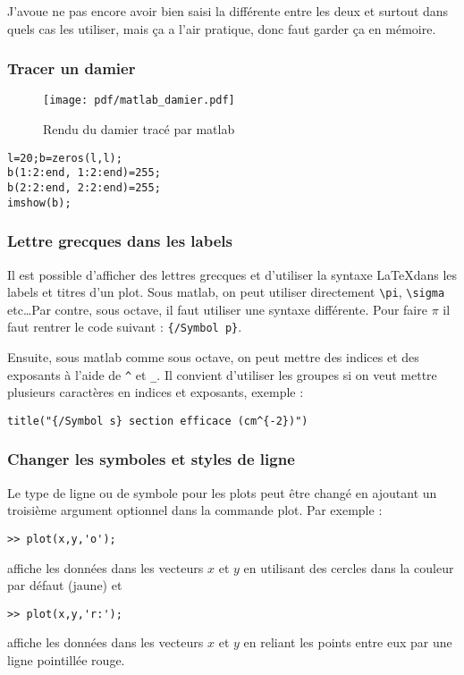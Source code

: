 \documentclass[a4paper,twoside]{article}
\begin{document}
J'avoue ne pas encore avoir bien saisi la différente entre les deux et surtout dans quels cas les utiliser, mais ça a l'air pratique, donc faut garder ça en mémoire.

\subsubsection{Tracer un damier}
\begin{figure}[htb]
\centering
\texttt{[image: pdf/matlab\_damier.pdf]}
\caption{Rendu du damier tracé par matlab}
\end{figure}

\begin{verbatim}
l=20;b=zeros(l,l);
b(1:2:end, 1:2:end)=255;
b(2:2:end, 2:2:end)=255;
imshow(b);
\end{verbatim}

\subsubsection{Lettre grecques dans les labels}
Il est possible d'afficher des lettres grecques et d'utiliser la syntaxe \LaTeX dans les labels et titres d'un plot. Sous matlab, on peut utiliser directement \verb|\pi|, \verb|\sigma| etc\dots Par contre, sous octave, il faut utiliser une syntaxe différente. Pour faire $\pi$ il faut rentrer le code suivant : \verb|{/Symbol p}|.

Ensuite, sous matlab comme sous octave, on peut mettre des indices et des exposants à l'aide de \verb|^| et \verb|_|. Il convient d'utiliser les groupes si on veut mettre plusieurs caractères en indices et exposants, exemple :

\begin{verbatim}
title("{/Symbol s} section efficace (cm^{-2})")
\end{verbatim}

\subsubsection{Changer les symboles et styles de ligne}

Le type de ligne ou de symbole pour les plots peut être changé en ajoutant un troisième argument optionnel dans la commande plot. Par exemple :
\begin{verbatim}
>> plot(x,y,'o');
\end{verbatim}
affiche les données dans les vecteurs $x$ et $y$ en utilisant des cercles dans la couleur par défaut (jaune) et
\begin{verbatim}
>> plot(x,y,'r:');
\end{verbatim}
affiche les données dans les vecteurs $x$ et $y$ en reliant les points entre eux par une ligne pointillée rouge.
\end{document}
